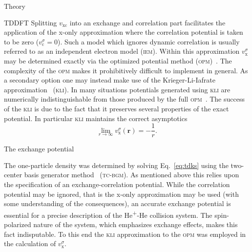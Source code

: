 \documentclass[aps, pra, reprint, groupedaddress, amsfonts, longbibliography,
               amsmath, amssymb, showpacs, nofootinbib]{revtex4-1}
\begin{document}
\begin{section}{Theory \label{sec:theory}}
\begin{subsection}{TDDFT \label{sec:tddft}}
      Splitting $v_\mathrm{xc}$ into an exchange and correlation part facilitates the application of the
      x-only approximation where the correlation potential is taken to be zero ($v^\sigma_\mathrm{c} =
      0$). Such a model which ignores dynamic correlation is usually referred to as an independent
      electron model (\textsc{iem}). Within this approximation $v^\sigma_\mathrm{x}$ may be determined
      exactly via the optimized potential method (\textsc{opm})~\cite{opm1, opm2, tdopm}. The complexity
      of the \textsc{opm} makes it prohibitively difficult to implement in general. As a secondary
      option one may instead make use of the Krieger-Li-Iafrate approximation~\cite{klieq, tdkli1,
      tdkli2} (\textsc{kli}). In many situations potentials generated using \textsc{kli} are numerically
      indistinguishable from those produced by the full \textsc{opm}~\cite{opm-rev}. The success of the
      \textsc{kli} is due to the fact that it preserves several properties of the exact potential. In
      particular \textsc{kli} maintains the correct asymptotics
      \begin{equation} \label{eq:asymp}
         \lim\limits_{r \rightarrow \infty} v_\mathrm{x}^\sigma (\mathbf{r}) = -\frac{1}{r}.
      \end{equation}
   
   \end{subsection}

   \begin{subsection}{The exchange potential \label{sec:xpot}}

      The one-particle density was determined by solving Eq.~\eqref{eq:tdks} using the two-center basis
      generator method~\cite{tcbgm} (\textsc{tc-bgm}). As mentioned above this relies upon the
      specification of an exchange-correlation potential. While the correlation potential may be
      ignored, that is the x-only approximation may be used (with some understanding of the
      consequences), an accurate exchange potential is essential for a precise description of the
      He\textsuperscript{+}-He collision system. The spin-polarized nature of the system, which
      emphasizes exchange effects, makes this fact indisputable. To this end the \textsc{kli}
      approximation to the \textsc{opm} was employed in the calculation of $v^\sigma_\mathrm{x}$.


\end{subsection}
\end{section}
\end{document}
